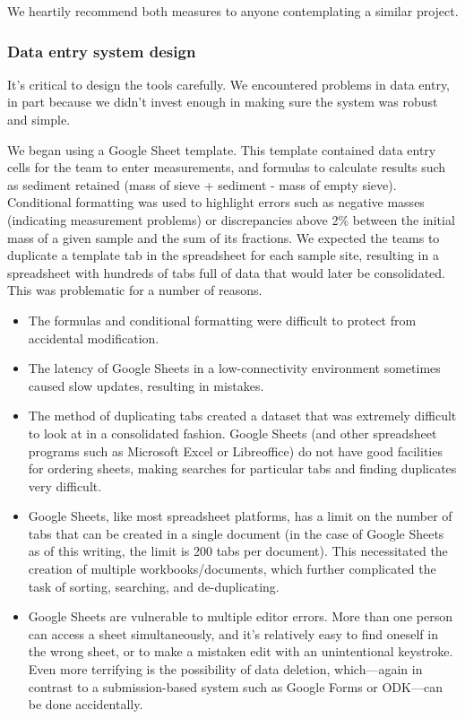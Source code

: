 \documentclass[a4paper,12pt,twoside]{article}
\begin{document}
We heartily recommend both measures to anyone contemplating a similar project.

\color{RHblue}
\subsubsection{Data entry system design}
\color{RHgrey}
It's critical to design the tools carefully. We encountered problems in data entry, in part because we didn't invest enough in making sure the system was robust and simple.

We began using a Google Sheet template. This template contained data entry cells for the team to enter measurements, and formulas to calculate results such as sediment retained (mass of sieve + sediment - mass of empty sieve). Conditional formatting was used to highlight errors such as negative masses (indicating measurement problems) or discrepancies above 2\% between the initial mass of a given sample and the sum of its fractions. We expected the teams to duplicate a template tab in the spreadsheet for each sample site, resulting in a spreadsheet with hundreds of tabs full of data that would later be consolidated. This was problematic for a number of reasons.

\begin{itemize}
  \item The formulas and conditional formatting were difficult to protect from accidental modification.
  \item The latency of Google Sheets in a low-connectivity environment sometimes caused slow updates, resulting in mistakes.
  \item The method of duplicating tabs created a dataset that was extremely difficult to look at in a consolidated fashion. Google Sheets (and other spreadsheet programs such as Microsoft Excel or Libreoffice) do not have good facilities for ordering sheets, making searches for particular tabs and finding duplicates very difficult.
  \item Google Sheets, like most spreadsheet platforms, has a limit on the number of tabs that can be created in a single document (in the case of Google Sheets as of this writing, the limit is 200 tabs per document). This necessitated the creation of multiple workbooks/documents, which further complicated the task of sorting, searching, and de-duplicating.
  \item Google Sheets are vulnerable to multiple editor errors. More than one person can access a sheet simultaneously, and it's relatively easy to find oneself in the wrong sheet, or to make a mistaken edit with an unintentional keystroke. Even more terrifying is the possibility of data deletion, which---again in contrast to a submission-based system such as Google Forms or ODK---can be done accidentally. 
\end{itemize}
\end{document}
